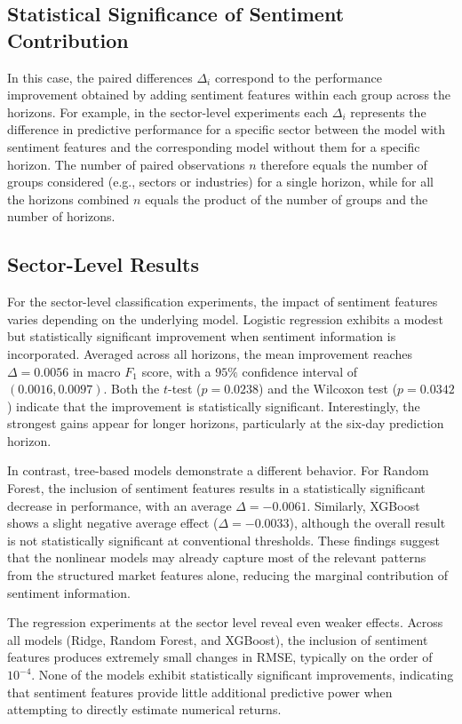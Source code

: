 \subsection{Statistical Significance of Sentiment Contribution}

In this case, the paired differences $\Delta_i$ correspond to the performance improvement obtained by adding sentiment features within each group across the horizons.
For example, in the sector-level experiments each $\Delta_i$ represents the difference in predictive performance for a specific sector between the model with sentiment features and the corresponding model without them for a specific horizon. 
The number of paired observations $n$ therefore equals the number of groups considered (e.g., sectors or industries) for a single horizon, while for all the horizons combined $n$ equals the product of the number of groups and the number of horizons.

\subsection{Sector-Level Results}

For the sector-level classification experiments, the impact of sentiment features varies depending on the underlying model. Logistic regression exhibits a modest but statistically significant improvement when sentiment information is incorporated. Averaged across all horizons, the mean improvement reaches $\Delta = 0.0056$ in macro $F_1$ score, with a $95\%$ confidence interval of $(0.0016, 0.0097)$. Both the $t$-test ($p = 0.0238$) and the Wilcoxon test ($p = 0.0342$) indicate that the improvement is statistically significant. Interestingly, the strongest gains appear for longer horizons, particularly at the six-day prediction horizon.

In contrast, tree-based models demonstrate a different behavior. For Random Forest, the inclusion of sentiment features results in a statistically significant decrease in performance, with an average $\Delta = -0.0061$. Similarly, XGBoost shows a slight negative average effect ($\Delta = -0.0033$), although the overall result is not statistically significant at conventional thresholds. These findings suggest that the nonlinear models may already capture most of the relevant patterns from the structured market features alone, reducing the marginal contribution of sentiment information.

The regression experiments at the sector level reveal even weaker effects. Across all models (Ridge, Random Forest, and XGBoost), the inclusion of sentiment features produces extremely small changes in RMSE, typically on the order of $10^{-4}$. None of the models exhibit statistically significant improvements, indicating that sentiment features provide little additional predictive power when attempting to directly estimate numerical returns.

